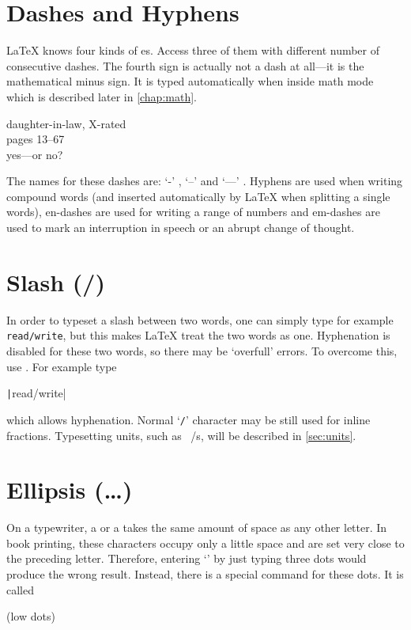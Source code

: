 \section{Dashes and Hyphens}

\LaTeX{} knows four kinds of es. Access three of them with different
number of consecutive dashes. The fourth sign is actually not a dash at
all---it is the mathematical minus sign. It is typed automatically when inside
math mode which is described later in \autoref{chap:math}.
\begin{example}
daughter-in-law, X-rated\\
pages 13--67\\
yes---or no?
\end{example}

The names for these dashes are: `-' \index{-}, `--'
\index{--} and `---' \index{---}. Hyphens are used when
writing compound words (and inserted automatically by \LaTeX{} when splitting a
single words), en-dashes are used for writing a range of numbers and em-dashes
are used to mark an interruption in speech or an abrupt change of thought.

\section{Slash (/)}

In order to typeset a slash between two words, one can simply type for example
\texttt{read/write}, but this makes \LaTeX{} treat the two words as one.
Hyphenation is disabled for these two words, so there may be
\enquote*{overfull} errors.  To overcome this, use .  For example
type
\begin{code}
  \texttt|read\slash write|
\end{code}
which allows hyphenation.  Normal
\enquote*{\texttt{/}} character may be still used for inline fractions.
Typesetting units, such as \unit[per-mode = symbol]{\mebi\byte\per\s}, will be
described in \autoref{sec:units}.

\section{Ellipsis (\ldots)}

On a typewriter, a  or a  takes the same amount of
space as any other letter. In book printing, these characters occupy
only a little space and are set very close to the preceding letter.
Therefore, entering \enquote*{} by just typing three
dots would produce the wrong result. Instead, there is a special
command for these dots. It is called
\begin{lscommand}
   (low dots)
\end{lscommand}

